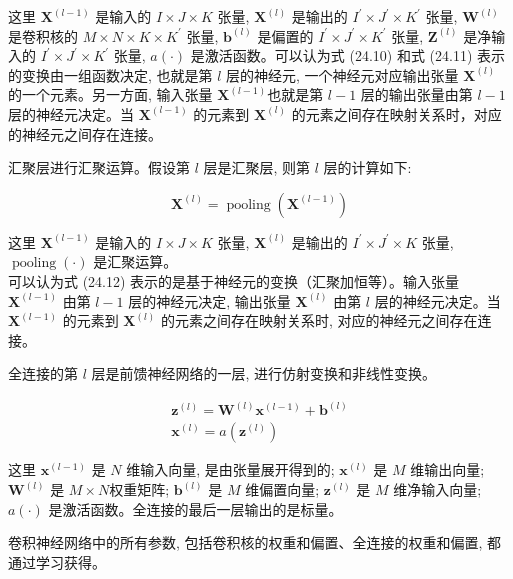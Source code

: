 \documentclass[10pt]{article}
\begin{document}
这里 $\boldsymbol{X}^{(l-1)}$ 是输入的 $I \times J \times K$ 张量, $\boldsymbol{X}^{(l)}$ 是输出的 $I^{\prime} \times J^{\prime} \times K^{\prime}$ 张量, $\boldsymbol{W}^{(l)}$ 是卷积核的 $M \times N \times K \times K^{\prime}$ 张量, $\boldsymbol{b}^{(l)}$ 是偏置的 $I^{\prime} \times J^{\prime} \times K^{\prime}$ 张量, $\boldsymbol{Z}^{(l)}$ 是净输入的 $I^{\prime} \times J^{\prime} \times K^{\prime}$ 张量, $a(\cdot)$ 是激活函数。可以认为式 (24.10) 和式 (24.11) 表示的变换由一组函数决定, 也就是第 $l$ 层的神经元, 一个神经元对应输出张量 $\boldsymbol{X}^{(l)}$ 的一个元素。另一方面, 输入张量 $\boldsymbol{X}^{(l-1)}$也就是第 $l-1$ 层的输出张量由第 $l-1$ 层的神经元决定。当 $\boldsymbol{X}^{(l-1)}$ 的元素到 $\boldsymbol{X}^{(l)}$ 的元素之间存在映射关系时，对应的神经元之间存在连接。

汇聚层进行汇聚运算。假设第 $l$ 层是汇聚层, 则第 $l$ 层的计算如下:


\begin{equation*}
\boldsymbol{X}^{(l)}=\operatorname{pooling}\left(\boldsymbol{X}^{(l-1)}\right) \tag{24.12}
\end{equation*}


这里 $\boldsymbol{X}^{(l-1)}$ 是输入的 $I \times J \times K$ 张量, $\boldsymbol{X}^{(l)}$ 是输出的 $I^{\prime} \times J^{\prime} \times K$ 张量, $\operatorname{pooling}(\cdot)$ 是汇聚运算。\\
可以认为式 (24.12) 表示的是基于神经元的变换（汇聚加恒等）。输入张量 $\boldsymbol{X}^{(l-1)}$ 由第 $l-1$ 层的神经元决定, 输出张量 $\boldsymbol{X}^{(l)}$ 由第 $l$ 层的神经元决定。当 $\boldsymbol{X}^{(l-1)}$ 的元素到 $\boldsymbol{X}^{(l)}$ 的元素之间存在映射关系时, 对应的神经元之间存在连接。

全连接的第 $l$ 层是前馈神经网络的一层, 进行仿射变换和非线性变换。


\begin{gather*}
\boldsymbol{z}^{(l)}=\boldsymbol{W}^{(l)} \boldsymbol{x}^{(l-1)}+\boldsymbol{b}^{(l)}  \tag{24.13}\\
\boldsymbol{x}^{(l)}=a\left(\boldsymbol{z}^{(l)}\right) \tag{24.14}
\end{gather*}


这里 $\boldsymbol{x}^{(l-1)}$ 是 $N$ 维输入向量, 是由张量展开得到的; $\boldsymbol{x}^{(l)}$ 是 $M$ 维输出向量; $\boldsymbol{W}^{(l)}$ 是 $M \times N$权重矩阵; $\boldsymbol{b}^{(l)}$ 是 $M$ 维偏置向量; $\boldsymbol{z}^{(l)}$ 是 $M$ 维净输入向量; $a(\cdot)$ 是激活函数。全连接的最后一层输出的是标量。

卷积神经网络中的所有参数, 包括卷积核的权重和偏置、全连接的权重和偏置, 都通过学习获得。
\end{document}
